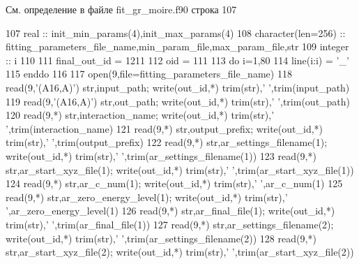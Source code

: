 См. определение в файле fit\+\_\+gr\+\_\+moire.\+f90 строка 107


\begin{DoxyCode}
107 \textcolor{keywordtype}{real}                    :: init\_min\_params(4),init\_max\_params(4)
108 \textcolor{keywordtype}{character}(len=256)      :: fitting\_parameters\_file\_name,min\_param\_file,max\_param\_file,str
109 integer                 :: i
110 
111     final\_out\_id = 1211
112     oid = 111
113     \textcolor{keywordflow}{do} i=1,80
114         line(i:i) = \textcolor{stringliteral}{'\_'}
115 \textcolor{keywordflow}{    enddo}
116 
117     \textcolor{keyword}{open}(9,file=fitting\_parameters\_file\_name)
118     \textcolor{keyword}{read}(9,\textcolor{stringliteral}{'(A16,A)'}) str,input\_path;       \textcolor{keyword}{write}(out\_id,*) trim(str),\textcolor{stringliteral}{'  '},trim(input\_path)
119     \textcolor{keyword}{read}(9,\textcolor{stringliteral}{'(A16,A)'}) str,out\_path;         \textcolor{keyword}{write}(out\_id,*) trim(str),\textcolor{stringliteral}{'  '},trim(out\_path)
120     \textcolor{keyword}{read}(9,*) str,interaction\_name;         \textcolor{keyword}{write}(out\_id,*) trim(str),\textcolor{stringliteral}{'  '},trim(interaction\_name)
121     \textcolor{keyword}{read}(9,*) str,output\_prefix;            \textcolor{keyword}{write}(out\_id,*) trim(str),\textcolor{stringliteral}{'  '},trim(output\_prefix)
122     \textcolor{keyword}{read}(9,*) str,ar\_settings\_filename(1);  \textcolor{keyword}{write}(out\_id,*) trim(str),\textcolor{stringliteral}{'  '},trim(ar\_settings\_filename(1))
123     \textcolor{keyword}{read}(9,*) str,ar\_start\_xyz\_file(1);     \textcolor{keyword}{write}(out\_id,*) trim(str),\textcolor{stringliteral}{'  '},trim(ar\_start\_xyz\_file(1))
124     \textcolor{keyword}{read}(9,*) str,ar\_c\_num(1);              \textcolor{keyword}{write}(out\_id,*) trim(str),\textcolor{stringliteral}{'  '},ar\_c\_num(1)
125     \textcolor{keyword}{read}(9,*) str,ar\_zero\_energy\_level(1);  \textcolor{keyword}{write}(out\_id,*) trim(str),\textcolor{stringliteral}{'  '},ar\_zero\_energy\_level(1)
126     \textcolor{keyword}{read}(9,*) str,ar\_final\_file(1);         \textcolor{keyword}{write}(out\_id,*) trim(str),\textcolor{stringliteral}{'  '},trim(ar\_final\_file(1))
127     \textcolor{keyword}{read}(9,*) str,ar\_settings\_filename(2);  \textcolor{keyword}{write}(out\_id,*) trim(str),\textcolor{stringliteral}{'  '},trim(ar\_settings\_filename(2))
128     \textcolor{keyword}{read}(9,*) str,ar\_start\_xyz\_file(2);     \textcolor{keyword}{write}(out\_id,*) trim(str),\textcolor{stringliteral}{'  '},trim(ar\_start\_xyz\_file(2))

\end{DoxyCode}
